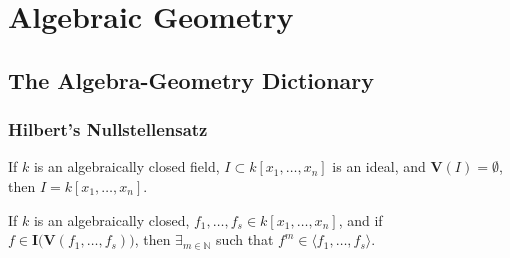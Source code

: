 \documentclass[crop=false,class=article,oneside]{standalone}
\begin{document}
    \ifx\ifmathcoursesalgebraicgeometry\undefined
        \section*{Algebraic Geometry}
        \setcounter{section}{1}
    \fi
    \subsection{The Algebra-Geometry Dictionary}
        \subsubsection{Hilbert's Nullstellensatz}
            \begin{theorem}
                If $k$ is an algebraically closed field,
                $I\subset k[x_1,\hdots ,x_n]$ is an ideal,
                and $\mathbf{V}(I)=\emptyset$,
                then $I=k[x_1,\hdots ,x_n]$.
            \end{theorem}
            \begin{theorem}
                If $k$ is an algebraically closed,
                $f_{1},\hdots,f_{s}\in k[x_{1},\hdots,x_{n}]$,
                and if
                $f\in\textbf{I}\big(\mathbf{V}(f_1,\hdots,f_s)\big)$,
                then $\exists_{m\in\mathbb{N}}$ such that
                $f^m \in \langle f_1,\hdots, f_s \rangle$.
            \end{theorem}
\end{document}

